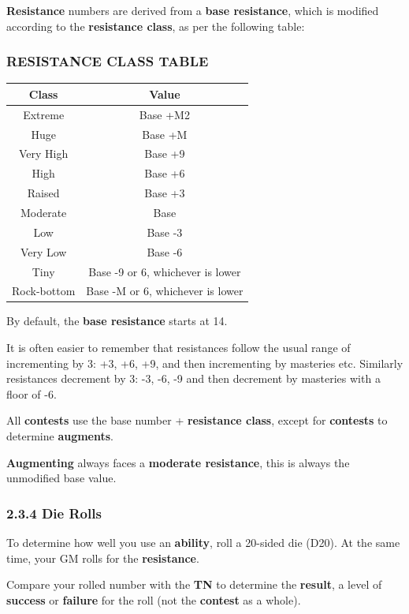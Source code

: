 \documentclass[
]{article}
\begin{document}
\textbf{Resistance} numbers are derived from a \textbf{base resistance},
which is modified according to the \textbf{resistance class}, as per the
following table:

\hypertarget{resistance-class-table}{%
\subsubsection{RESISTANCE CLASS TABLE}\label{resistance-class-table}}

\begin{longtable}[]{@{}cc@{}}
\toprule
Class & Value\tabularnewline
\midrule
\endhead
Extreme & Base +M2\tabularnewline
Huge & Base +M\tabularnewline
Very High & Base +9\tabularnewline
High & Base +6\tabularnewline
Raised & Base +3\tabularnewline
Moderate & Base\tabularnewline
Low & Base -3\tabularnewline
Very Low & Base -6\tabularnewline
Tiny & Base -9 or 6, whichever is lower\tabularnewline
Rock-bottom & Base -M or 6, whichever is lower\tabularnewline
\bottomrule
\end{longtable}

By default, the \textbf{base resistance} starts at 14.

It is often easier to remember that resistances follow the usual range
of incrementing by 3: +3, +6, +9, and then incrementing by masteries
etc. Similarly resistances decrement by 3: -3, -6, -9 and then decrement
by masteries with a floor of -6.

All \textbf{contests} use the base number + \textbf{resistance class},
except for \textbf{contests} to determine \textbf{augments}.

\textbf{Augmenting} always faces a \textbf{moderate resistance}, this is
always the unmodified base value.

\hypertarget{die-rolls}{%
\subsubsection{2.3.4 Die Rolls}\label{die-rolls}}

To determine how well you use an \textbf{ability}, roll a 20-sided die
(D20). At the same time, your GM rolls for the \textbf{resistance}.

Compare your rolled number with the \textbf{TN} to determine the
\textbf{result}, a level of \textbf{success} or \textbf{failure} for the
roll (not the \textbf{contest} as a whole).
\end{document}
